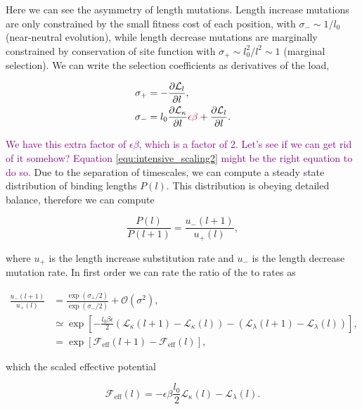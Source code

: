 \documentclass[10pt,a4paper]{article}
\newcommand{\purple}[1]{\textcolor{purple}{#1}}
\begin{document}
\noindent Here we can see the asymmetry of length mutations. Length increase mutations are only constrained by the small fitness cost of each position, with $\sigma_-\sim 1/l_0$ (near-neutral evolution), while length decrease mutations  are marginally constrained by conservation of site function with $\sigma_+ \sim l_0^2/l^2\sim 1$ (marginal selection). We can write the selection coefficients as derivatives of the load,

\begin{align}
	\sigma_+ &= -\frac{\partial \mathcal{L}_l}{\partial l},\\
	\sigma_- &= l_0\frac{\partial \mathcal{L}_\kappa}{\partial l}\purple{\epsilon\beta} +\frac{\partial \mathcal{L}_l}{\partial l}.
\end{align}

\noindent \purple{We have this extra factor of $\epsilon\beta$, which is a factor of 2. Let's see if we can get rid of it somehow? Equation \ref{equ:intensive_scaling2} might be the right equation to do so.} Due to the separation of timescales, we can compute a steady state distribution of binding lengths $P(l)$. This distribution is obeying detailed balance, therefore we can compute

\begin{equation}
	\frac{P(l)}{P(l+1)}= \frac{u_-(l+1)}{u_+(l)},
\end{equation}

\noindent where $u_+$ is the length increase substitution rate and $u_-$ is the length decrease mutation rate. In first order we can rate the ratio of the to rates as 

\begin{align}
	\frac{u_-(l+1)}{u_+(l)} &= \frac{\exp(\sigma_+/2)}{\exp(\sigma_-/2)} + \mathcal{O}(\sigma^2),\\
	&\simeq\exp\left[ -\frac{l_0\beta\epsilon}{2}\left( \mathcal{L}_\kappa(l+1) - \mathcal{L}_\kappa(l) \right) - \left( \mathcal{L}_\lambda(l+1) - \mathcal{L}_\lambda(l) \right)\right],\\
	&=\exp\left[ \mathcal{F}_\mathrm{eff}(l+1) - \mathcal{F}_\mathrm{eff}(l) \right],
\end{align}

\noindent which the scaled effective potential

\begin{equation}
	\mathcal{F}_\mathrm{eff}(l) = -\epsilon\beta\frac{l_0}{2}\mathcal{L}_\kappa(l) - \mathcal{L}_\lambda (l).
\end{equation}
\end{document}
